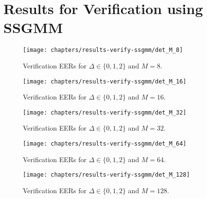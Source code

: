 \chapter{Results for Verification using SSGMM}
\label{apx:results-verify-ssgmm}



\begin{figure}[ht]
	\centering
	\texttt{[image: chapters/results-verify-ssgmm/det\_M\_8]}
	\caption{Verification EERs for $\Delta \in \{0, 1, 2\}$ and $M = 8$.}
	\label{fig:results-verify-ssgmm_M_8}
\end{figure}

\newpage


\begin{figure}[ht]
	\centering
	\texttt{[image: chapters/results-verify-ssgmm/det\_M\_16]}
	\caption{Verification EERs for $\Delta \in \{0, 1, 2\}$ and $M = 16$.}
	\label{fig:results-verify-ssgmm_M_16}
\end{figure}

\newpage


\begin{figure}[ht]
	\centering
	\texttt{[image: chapters/results-verify-ssgmm/det\_M\_32]}
	\caption{Verification EERs for $\Delta \in \{0, 1, 2\}$ and $M = 32$.}
	\label{fig:results-verify-ssgmm_M_32}
\end{figure}

\newpage


\begin{figure}[ht]
	\centering
	\texttt{[image: chapters/results-verify-ssgmm/det\_M\_64]}
	\caption{Verification EERs for $\Delta \in \{0, 1, 2\}$ and $M = 64$.}
	\label{fig:results-verify-ssgmm_M_64}
\end{figure}

\newpage


\begin{figure}[ht]
	\centering
	\texttt{[image: chapters/results-verify-ssgmm/det\_M\_128]}
	\caption{Verification EERs for $\Delta \in \{0, 1, 2\}$ and $M = 128$.}
	\label{fig:results-verify-ssgmm_M_128}
\end{figure}
